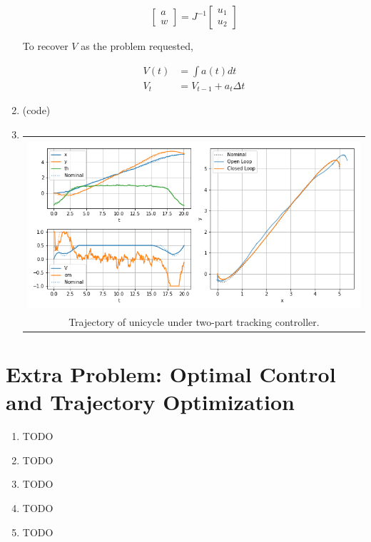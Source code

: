 \documentclass{article}
\begin{document}
\begin{enumerate}[label=(\roman*)]
	\begin{equation}
	\begin{bmatrix}
	a \\
	w
	\end{bmatrix}
	=
	J^{-1}
	\begin{bmatrix}
	u_1 \\
	u_2
	\end{bmatrix}
	\end{equation}
	
	To recover $V$ as the problem requested,
	
	\begin{equation}
	\begin{aligned}
	V(t) &= \int a(t) dt \\
	V_t &= V_{t-1} + a_t \Delta t
	\end{aligned}
	\end{equation}
	
	\item %
	(code)
	
	\item %
	\begin{tabular}[t]{c}
	\hline \\
	\includegraphics[width=1.0\textwidth]{img/sim_traj_closedloop.png} \\
	Trajectory of unicycle under two-part tracking controller. \\
	\hline
	\end{tabular}
	
	\end{enumerate}

\pagebreak

\section*{Extra Problem: Optimal Control and Trajectory Optimization}

	\begin{enumerate}[label=(\roman*)]
	
	\item %
	TODO
	
	\item %
	TODO
	
	\item %
	TODO
	
	\item %
	TODO

	\item %
	TODO
	
	
	\end{enumerate}
\end{document}
